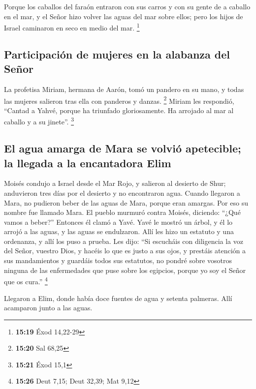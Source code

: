  Porque los caballos del faraón entraron con sus carros y
con su gente de a caballo en el mar, y el Señor hizo volver las aguas
del mar sobre ellos; pero los hijos de Israel caminaron en seco en medio
del mar. \footnote{\textbf{15:19} Éxod 14,22-29}

\hypertarget{participaciuxf3n-de-mujeres-en-la-alabanza-del-seuxf1or}{%
\subsection{Participación de mujeres en la alabanza del
Señor}\label{participaciuxf3n-de-mujeres-en-la-alabanza-del-seuxf1or}}

 La profetisa Miriam, hermana de Aarón, tomó un pandero
en su mano, y todas las mujeres salieron tras ella con panderos y
danzas. \footnote{\textbf{15:20} Sal 68,25}  Miriam les
respondió, ``Cantad a Yahvé, porque ha triunfado gloriosamente. Ha
arrojado al mar al caballo y a su jinete''. \footnote{\textbf{15:21}
  Éxod 15,1}

\hypertarget{el-agua-amarga-de-mara-se-volviuxf3-apetecible-la-llegada-a-la-encantadora-elim}{%
\subsection{El agua amarga de Mara se volvió apetecible; la llegada a la
encantadora
Elim}\label{el-agua-amarga-de-mara-se-volviuxf3-apetecible-la-llegada-a-la-encantadora-elim}}

 Moisés condujo a Israel desde el Mar Rojo, y salieron al
desierto de Shur; anduvieron tres días por el desierto y no encontraron
agua.  Cuando llegaron a Mara, no pudieron beber de las
aguas de Mara, porque eran amargas. Por eso su nombre fue llamado Mara.
 El pueblo murmuró contra Moisés, diciendo: ``¿Qué vamos
a beber?''  Entonces él clamó a Yavé. Yavé le mostró un
árbol, y él lo arrojó a las aguas, y las aguas se endulzaron. Allí les
hizo un estatuto y una ordenanza, y allí los puso a prueba.
 Les dijo: ``Si escucháis con diligencia la voz del
Señor, vuestro Dios, y hacéis lo que es justo a sus ojos, y prestáis
atención a sus mandamientos y guardáis todos sus estatutos, no pondré
sobre vosotros ninguna de las enfermedades que puse sobre los egipcios,
porque yo soy el Señor que os cura.'' \footnote{\textbf{15:26} Deut
  7,15; Deut 32,39; Mat 9,12}

 Llegaron a Elim, donde había doce fuentes de agua y
setenta palmeras. Allí acamparon junto a las aguas.

